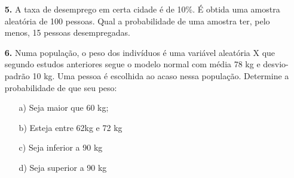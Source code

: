\begin{itemize}
	\item[\textbf{5.}] A taxa de desemprego em certa cidade é de 10\%. É obtida uma amostra aleatória de 100 pessoas. Qual a probabilidade de uma amostra ter, pelo menos, 15 pessoas desempregadas.
	
	\item[\textbf{6.}] Numa população, o peso dos indivíduos é uma variável aleatória X que segundo estudos anteriores segue o modelo normal com média 78 kg e desvio-padrão 10 kg. Uma pessoa é escolhida ao acaso nessa população. Determine a probabilidade de que seu peso:
		\begin{itemize}
		\item[a)] Seja maior que 60 kg;
	        \resposta{}
		\item[b)] Esteja entre 62kg e 72 kg
		    \resposta{}
		\item[c)] Seja inferior a 90 kg
		    \resposta{}
		\item[d)] Seja superior a 90 kg
		    \resposta{}
	\end{itemize}
	
\end{itemize}